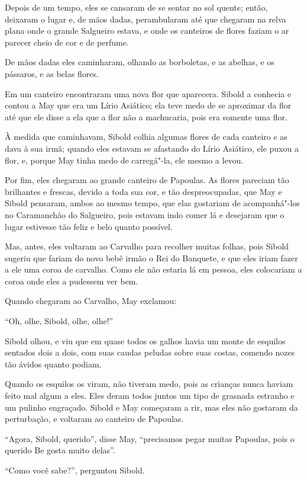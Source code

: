 Depois de um tempo, eles se cansaram de se sentar no sol quente; então,
deixaram o lugar e, de mãos dadas, perambularam até que chegaram na
relva plana onde o grande Salgueiro estava, e onde os canteiros de
flores faziam o ar parecer cheio de cor e de perfume.

De mãos dadas eles caminharam, olhando as borboletas, e as abelhas, e os
pássaros, e as belas flores.

Em um canteiro encontraram uma nova flor que aparecera. Sibold a
conhecia e contou a May que era um Lírio Asiático; ela teve medo de se
aproximar da flor até que ele disse a ela que a flor não a machucaria,
pois era somente uma flor.

À medida que caminhavam, Sibold colhia algumas flores de cada canteiro e
as dava à sua irmã; quando eles estavam se afastando do Lírio Asiático,
ele puxou a flor, e, porque May tinha medo de carregá"-la, ele mesmo a
levou.

Por fim, eles chegaram ao grande canteiro de Papoulas. As flores
pareciam tão brilhantes e frescas, devido a toda sua cor, e tão
despreocupadas, que May e Sibold pensaram, ambos ao mesmo tempo, que
elas gostariam de acompanhá"-los no Caramanchão do Salgueiro, pois estavam
indo comer lá e desejaram que o lugar estivesse tão feliz e belo quanto
possível.

Mas, antes, eles voltaram ao Carvalho para recolher muitas folhas, pois
Sibold sugeriu que fariam do novo bebê irmão o Rei do Banquete, e que
eles iriam fazer a ele uma coroa de carvalho. Como ele não estaria lá em
pessoa, eles colocariam a coroa onde eles a pudessem ver bem.

Quando chegaram ao Carvalho, May exclamou:

``Oh, olhe, Sibold, olhe, olhe!''

Sibold olhou, e viu que em quase todos os galhos havia um monte de
esquilos sentados dois a dois, com suas caudas peludas sobre suas
costas, comendo nozes tão ávidos quanto podiam.

Quando os esquilos os viram, não tiveram medo, pois as crianças nunca
haviam feito mal algum a eles. Eles deram todos juntos um tipo de
grasnada estranho e um pulinho engraçado. Sibold e May começaram a rir,
mas eles não gostaram da perturbação, e voltaram ao canteiro de
Papoulas.

``Agora, Sibold, querido'', disse May, ``precisamos pegar muitas
Papoulas, pois o querido Be gosta muito delas''.

``Como você sabe?'', perguntou Sibold.

